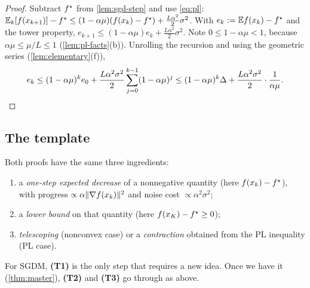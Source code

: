 \begin{proof}
Subtract $f^\star$ from \cref{lem:sgd-step} and use \eqref{eq:pl}:
$\mathbb{E}_k[f(x_{k+1})]-f^\star\le(1-\alpha\mu)(f(x_k)-f^\star)+\frac{L\alpha^2}{2}\sigma^2$. With
$e_k:=\mathbb{E} f(x_k)-f^\star$ and the tower property, $e_{k+1}\le(1-\alpha\mu)e_k+\frac{L\alpha^2}2\sigma^2$.
Note $0\le1-\alpha\mu<1$, because $\alpha\mu\le\mu/L\le1$ (\cref{lem:pl-facts}(b)).
Unrolling the recursion and using the geometric series (\cref{lem:elementary}(f)),
\[
  e_k\le(1-\alpha\mu)^ke_0+\frac{L\alpha^2\sigma^2}{2}\sum_{j=0}^{k-1}(1-\alpha\mu)^j
  \le(1-\alpha\mu)^k\Delta+\frac{L\alpha^2\sigma^2}{2}\cdot\frac1{\alpha\mu}. \qedhere
\]
\end{proof}

\subsection{The template}\label{sec:template}

Both proofs have the same three ingredients:
\begin{enumerate}[label=\textbf{(T\arabic*)}]
\item a \emph{one-step expected decrease} of a nonnegative quantity (here $f(x_k)-f^\star$),
      with progress $\propto\alpha\lVert \nabla f(x_k)\rVert^2$ and noise cost $\propto\alpha^2\sigma^2$;
\item a \emph{lower bound} on that quantity (here $f(x_K)-f^\star\ge0$);
\item \emph{telescoping} (nonconvex case) or a \emph{contraction} obtained from the PL
      inequality (PL case).
\end{enumerate}
For SGDM, \textbf{(T1)} is the only step that requires a new idea. Once we have it
(\cref{thm:master}), \textbf{(T2)} and \textbf{(T3)} go through as above.
